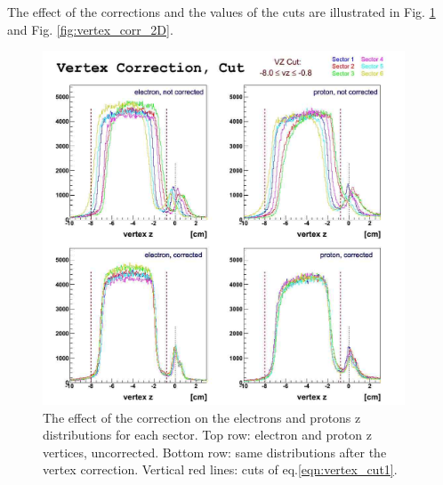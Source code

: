 The effect of the corrections and the values of the cuts are illustrated in 
Fig. \ref{fig:vertex_corr} and  Fig. \ref{fig:vertex_corr_2D}.

\begin{figure}[h]
	\centering
		\includegraphics[width=0.96\textwidth ]{img/vtx_all_sector.jpg}
			\caption{The effect of the correction on the electrons and protons z 
						distributions for each sector. Top row: electron and proton
						z vertices, uncorrected. Bottom row: same distributions after
						the vertex correction. Vertical red lines: cuts of eq.\ref{eqn:vertex_cut1}. }
			\label{fig:vertex_corr}
\end{figure}

